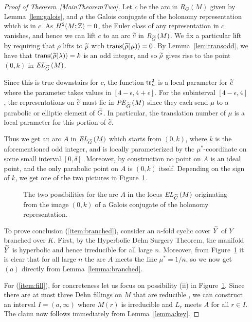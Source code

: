 \documentclass[tikz, sepfignums, defaultenums]{nmd/article}
\newcommand{\RG}[1]{\mathit{R}_{G}\left(#1\right)}
\newcommand{\RGtil}[1]{\mathit{R}_{\Gtil}\left(#1\right)}
\newcommand{\RGtilPE}[1]{\mathit{PE}_{\Gtil}\left(#1\right)}
\DeclareMathOperator{\trans}{trans}
\newcommand{\TEL}[1]{\mathit{EL}_\Gtil\left(#1\right)}
\begin{document}
\begin{proof}[Proof of Theorem~\ref{MainTheoremTwo}]
Let $c$ be the arc in $\RG{M}$ given by Lemma~\ref{lem:galois}, and
$\rho$ the Galois conjugate of the holonomy representation which is in
$c$.  As $H^2(M; {\mathbb Z}) = 0$, the Euler class of any representation in
$c$ vanishes, and hence we can lift $c$ to an arc $\ctil$ in
$\RGtil{M}$.  We fix a particular lift by requiring that $\rho$ lifts
to $\rhotil$ with $\trans(\rhotil(\mu)) = 0$.  By
Lemma~\ref{lem:transodd}, we have that $\trans(\rhotil(\lambda)) = k$
is an odd integer, and so $\rhotil$ gives rise to the point $(0, k)$
in $\TEL{M}$.

Since this is true downstairs for $c$, the function $\operatorname{tr}^2_\mu$ is a
local parameter for $\ctil$ where the parameter takes values in
$[4 - \epsilon, 4 + \epsilon]$.  For the subinterval
$[4 - \epsilon, 4]$, the representations on $\ctil$ must lie in
$\RGtilPE{M}$ since they each send $\mu$ to a parabolic or elliptic
element of $\Gtil$. In particular, the translation number of $\mu$ is
a local parameter for this portion of $\ctil$.

Thus we get an arc $A$ in $\TEL{M}$ which starts from $(0, k)$, where
$k$ is the aforementioned odd integer, and is locally parameterized by
the $\mu^*$-coordinate on some small interval $[0, \delta]$.
Moreover, by construction no point on $A$ is an ideal point, and the
only parabolic point on $A$ is $(0, k)$ itself.  Depending on the
sign of $k$, we get one of the two pictures in Figure~\ref{fig:thm2}.

\begin{figure}
  \begin{center}
    
  \end{center}
  \caption{The two possibilities for the arc $A$ in the locus $\TEL{M}$
  originating from the image $(0, k)$ of a Galois conjugate of the
  holonomy representation.}
  \label{fig:thm2}
\end{figure}
 
To prove conclusion (\ref{item:branched}), consider an $n$-fold
cyclic cover $\Ytil$ of $Y$ branched over $K$.  First, by
the Hyperbolic Dehn Surgery Theorem, the manifold $\Ytil$ is hyperbolic
and hence irreducible for all large $n$.  Moreover, from
Figure~\ref{fig:thm2} it is clear that for all large $n$ the arc $A$
meets the line $\mu^* = 1/n$, so we now get $(a)$ directly from
Lemma~\ref{lemma:branched}. 

For (\ref{item:fill}), for concreteness let us focus on possibility
(ii) in Figure~\ref{fig:thm2}.  Since there are at most three Dehn
fillings on $M$ that are reducible \cite[Theorem
1.2]{GordonLuecke1996}, we can construct an interval $I = (a, \infty)$
where $M(r)$ is irreducible and $L_r$ meets $A$ for all $r \in I$.
The claim now follows immediately from Lemma~\ref{lemma:key}.


\end{proof}
\end{document}
